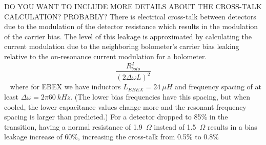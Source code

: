 DO YOU WANT TO INCLUDE MORE DETAILS ABOUT THE CROSS-TALK CALCULATION? PROBABLY? 
There is electrical cross-talk between detectors due to the modulation of the detector resistance which results in the modulation of the carrier bias. 
The level of this leakage is approximated by calculating the current modulation due to the neighboring bolometer's carrier bias leaking relative to the on-resonance current modulation for a bolometer. 
\begin{equation}
\frac{R_{bolo}^2}{(2\Delta \omega L)^2}
\end{equation}
~\citep{Dobbs2011}
where for \ac{EBEX} we have inductors $L_{EBEX} = 24~\mu H$ and frequency spacing of at least $\Delta \omega = 2\pi 60~kHz$. 
(The lower bias frequencies have this spacing, but when cooled, the lower capacitance values change more and the resonant frequency spacing is larger than predicted.)
For a detector dropped to 85\% in the transition, having a normal resistance of 1.9~$\Omega$ instead of 1.5~$\Omega$ results in a bias leakage increase of 60\%, increasing the cross-talk from 0.5\% to 0.8\%




